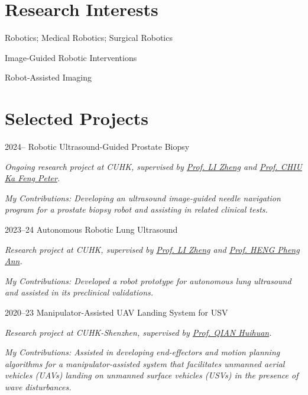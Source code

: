\documentclass[11pt,letterpaper]{report}
\newcommand{\listitemspace}{0.25em}
\renewenvironment{itemize}
{\begin{list}{}{\setlength{\leftmargin}{0em}
			\setlength{\parskip}{0em}
			\setlength{\itemsep}{\listitemspace}
			\setlength{\parsep}{\listitemspace}}}
	{\end{list}}
\begin{document}
\section*{Research Interests}
\begin{itemize}
	\item Robotics; Medical Robotics; Surgical Robotics
	\item Image-Guided Robotic Interventions
	\item Robot-Assisted Imaging
\end{itemize}
	
\section*{Selected Projects}
\begin{tablist}
	
	\item[2024--] \tab Robotic Ultrasound-Guided Prostate Biopsy

	\textit{Ongoing research project at CUHK, supervised by  \href{https://www.surgery.cuhk.edu.hk/profile.asp?alias=zli}{Prof. LI Zheng} and \href{https://www.surgery.cuhk.edu.hk/profile.asp?alias=peterchiu}{Prof. CHIU Ka Feng Peter}.}
	
	\textit{My Contributions: Developing an ultrasound image-guided needle navigation program for a prostate biopsy robot and assisting in related clinical tests.}
	
	\item[2023--24] \tab Autonomous Robotic Lung Ultrasound
	
	\textit{Research project at CUHK, supervised by \href{https://www.surgery.cuhk.edu.hk/profile.asp?alias=zli}{Prof. LI Zheng} and \href{https://www.cse.cuhk.edu.hk/people/faculty/pheng-ann-heng/}{Prof. HENG Pheng Ann}.}
	
	\emph{My Contributions: Developed a robot prototype for autonomous lung ultrasound and assisted in its preclinical validations.}

	\item[2020--23] \tab Manipulator-Assisted UAV Landing System for USV
	
	\textit{Research project at CUHK-Shenzhen, supervised by \href{https://sse.cuhk.edu.cn/en/faculty/qianhuihuan}{Prof. QIAN Huihuan}.}
	
	\emph{My Contributions: Assisted in developing end-effectors and motion planning algorithms for a manipulator-assisted system that facilitates unmanned aerial vehicles (UAVs) landing on unmanned surface vehicles (USVs) in the presence of wave disturbances. }	
\end{tablist}
	
\end{document}
